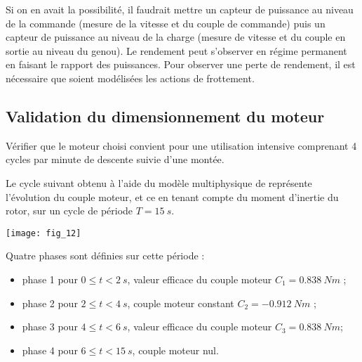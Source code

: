 \ifprof
\begin{corrige}
Si on en avait la possibilité, il faudrait mettre un capteur de puissance au niveau de la commande (mesure de la vitesse et du couple de commande) puis un capteur de puissance au niveau de la charge (mesure de vitesse et du couple en sortie au niveau du genou). Le rendement peut s'observer en régime permanent en faisant le rapport des puissances. 
Pour observer une perte de rendement, il est nécessaire que soient modélisées les actions de frottement.
\end{corrige}
\else
\fi

\subsection*{Validation du dimensionnement du moteur}
\begin{obj}
Vérifier que le moteur choisi convient pour une utilisation intensive comprenant 4 cycles par minute
de descente suivie d’une montée.
\end{obj}

\ifprof
\else

Le cycle suivant obtenu à l’aide du modèle multiphysique de représente l’évolution du couple moteur,
et ce en tenant compte du moment d’inertie du rotor, sur un cycle de période $T=\SI{15}{s}$.



\begin{marginfigure}
\texttt{[image: fig\_12]}
\end{marginfigure}


\noindent Quatre phases sont définies sur cette période :
\begin{itemize}
\item phase 1 pour $0 \leq t < \SI{2}{s}$, valeur efficace du couple moteur $C_1 = \SI{0,838}{Nm}$ ;
\item phase 2 pour $2 \leq t < \SI{4}{s}$, couple moteur constant $C_2 = -\SI{0,912}{Nm}$ ;
\item phase 3 pour $4 \leq t < \SI{6}{s}$, valeur efficace du couple moteur $C_3 = \SI{0,838}{Nm}$;
\item phase 4 pour $6 \leq t < \SI{15}{s}$, couple moteur nul.
\end{itemize}




